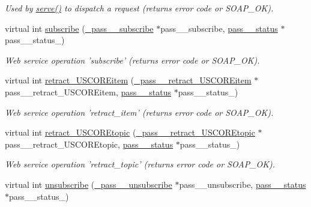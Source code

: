 \begin{DoxyCompactItemize}
\begin{DoxyCompactList}\small\item\em Used by \hyperlink{classPASSPortBindingService_a359b2e10ba55d654f92f3c314cbc1a5a}{serve()} to dispatch a request (returns error code or SOAP\_\-OK). \item\end{DoxyCompactList}\item 
virtual int \hyperlink{classPASSPortBindingService_a2078c6b6e2359c4992be179e0713c086}{subscribe} (\hyperlink{class__pass____subscribe}{\_\-pass\_\-\_\-subscribe} $\ast$pass\_\-\_\-subscribe, \hyperlink{classpass____status}{pass\_\-\_\-status} $\ast$pass\_\-\_\-status\_\-)
\begin{DoxyCompactList}\small\item\em Web service operation 'subscribe' (returns error code or SOAP\_\-OK). \item\end{DoxyCompactList}\item 
\hypertarget{classPASSPortBindingService_a3237e3ec8b52eac78652f47723e0eb43}{
virtual int \hyperlink{classPASSPortBindingService_a3237e3ec8b52eac78652f47723e0eb43}{retract\_\-USCOREitem} (\hyperlink{class__pass____retract__USCOREitem}{\_\-pass\_\-\_\-retract\_\-USCOREitem} $\ast$pass\_\-\_\-retract\_\-USCOREitem, \hyperlink{classpass____status}{pass\_\-\_\-status} $\ast$pass\_\-\_\-status\_\-)}
\label{classPASSPortBindingService_a3237e3ec8b52eac78652f47723e0eb43}

\begin{DoxyCompactList}\small\item\em Web service operation 'retract\_\-item' (returns error code or SOAP\_\-OK). \item\end{DoxyCompactList}\item 
\hypertarget{classPASSPortBindingService_a6c78c258df32ceb4a026a3bcf394c3c1}{
virtual int \hyperlink{classPASSPortBindingService_a6c78c258df32ceb4a026a3bcf394c3c1}{retract\_\-USCOREtopic} (\hyperlink{class__pass____retract__USCOREtopic}{\_\-pass\_\-\_\-retract\_\-USCOREtopic} $\ast$pass\_\-\_\-retract\_\-USCOREtopic, \hyperlink{classpass____status}{pass\_\-\_\-status} $\ast$pass\_\-\_\-status\_\-)}
\label{classPASSPortBindingService_a6c78c258df32ceb4a026a3bcf394c3c1}

\begin{DoxyCompactList}\small\item\em Web service operation 'retract\_\-topic' (returns error code or SOAP\_\-OK). \item\end{DoxyCompactList}\item 
\hypertarget{classPASSPortBindingService_a1b7e8e8d67903a4275044b641c6eb352}{
virtual int \hyperlink{classPASSPortBindingService_a1b7e8e8d67903a4275044b641c6eb352}{unsubscribe} (\hyperlink{class__pass____unsubscribe}{\_\-pass\_\-\_\-unsubscribe} $\ast$pass\_\-\_\-unsubscribe, \hyperlink{classpass____status}{pass\_\-\_\-status} $\ast$pass\_\-\_\-status\_\-)}
\label{classPASSPortBindingService_a1b7e8e8d67903a4275044b641c6eb352}


\end{DoxyCompactItemize}
